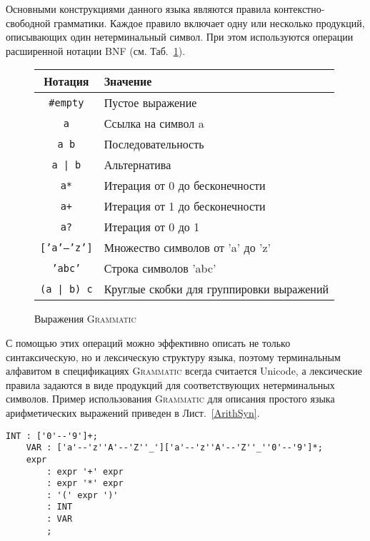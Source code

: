 \documentclass[12pt,a4paper]{article}
\newcommand{\lstref}[1]{Лист.~\ref{#1}}
\newcommand{\tabref}[1]{Таб.~\ref{#1}}
\newcommand{\code}[1]{\mbox{\texttt{#1}}}
\newcommand{\tool}[1]{\textsc{#1}}
\theoremstyle{definition}
\theoremstyle{plain}
\newcommand{\GRM}{\tool{Grammatic}}
\begin{document}
Основными конструкциями данного языка являются правила контекстно-свободной грамматики. Каждое правило включает одну или несколько продукций, описывающих один нетерминальный символ. При этом используются операции расширенной нотации BNF (см. \tabref{operations}). 
\begin{figure}[htbp]
\center
	\begin{tabular}{|c|l|}
	\hline
	\bf Нотация & \bf Значение \\
	\hline
	\code{\#empty} & Пустое выражение \\
	\code{a} & Ссылка на символ a \\
	\code{a b} & Последовательность \\
	\code{a | b} & Альтернатива \\
	\code{a*} & Итерация от 0 до бесконечности \\
	\code{a+} & Итерация от 1 до бесконечности \\
	\code{a?} & Итерация от 0 до 1 \\
	\code{['a'--'z']} & Множество символов от 'a' до 'z' \\
	\code{'abc'} & Строка символов 'abc' \\
	\code{(a | b) c} & Круглые скобки для группировки выражений \\
	\hline
	\end{tabular}
	\caption{Выражения \GRM{}}\label{operations}
\end{figure}
С помощью этих операций можно эффективно описать не только синтаксическую, но и лексическую структуру языка, поэтому терминальным алфавитом в спецификациях \GRM{} всегда считается Unicode, а лексические правила задаются в виде продукций для соответствующих нетерминальных символов. Пример использования \GRM{} для описания простого языка арифметических выражений приведен в \lstref{ArithSyn}.
\begin{lstlisting}[float=htbp,label=ArithSyn,caption=Синтаксис языка арифметических выражений]
	INT : ['0'--'9']+;
	VAR : ['a'--'z''A'--'Z''_']['a'--'z''A'--'Z''_''0'--'9']*;
	expr
		: expr '+' expr
		: expr '*' expr
		: '(' expr ')'
		: INT
		: VAR
		;
\end{lstlisting}
\end{document}
